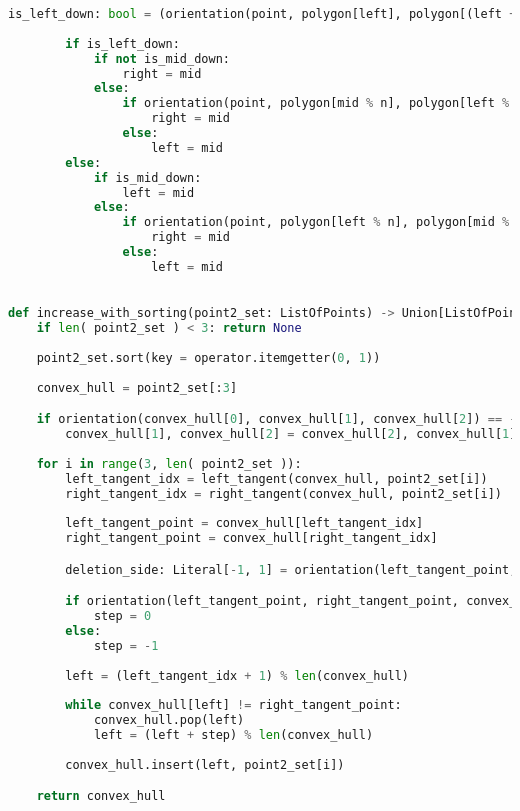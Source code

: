 \documentclass[11pt]{article}
\theoremstyle{remark} \newtheorem{definition}{def.}
\theoremstyle{definition} \newtheorem{twierdzenie}{tw.}
\begin{document}
\begin{lstlisting}[language=Python]
        is_left_down: bool = (orientation(point, polygon[left], polygon[(left + 1) % n]) == 1)
        
        if is_left_down:
            if not is_mid_down:
                right = mid
            else:
                if orientation(point, polygon[mid % n], polygon[left % n]) == 1:
                    right = mid
                else:
                    left = mid
        else:
            if is_mid_down:
                left = mid
            else:
                if orientation(point, polygon[left % n], polygon[mid % n]) == 1:
                    right = mid
                else:
                    left = mid

        
def increase_with_sorting(point2_set: ListOfPoints) -> Union[ListOfPoints, None]:
    if len( point2_set ) < 3: return None
    
    point2_set.sort(key = operator.itemgetter(0, 1))
    
    convex_hull = point2_set[:3]

    if orientation(convex_hull[0], convex_hull[1], convex_hull[2]) == -1:
        convex_hull[1], convex_hull[2] = convex_hull[2], convex_hull[1]
    
    for i in range(3, len( point2_set )):
        left_tangent_idx = left_tangent(convex_hull, point2_set[i])
        right_tangent_idx = right_tangent(convex_hull, point2_set[i])
        
        left_tangent_point = convex_hull[left_tangent_idx]
        right_tangent_point = convex_hull[right_tangent_idx]        

        deletion_side: Literal[-1, 1] = orientation(left_tangent_point, right_tangent_point, point2_set[i])

        if orientation(left_tangent_point, right_tangent_point, convex_hull[(left_tangent_idx + 1) % len(convex_hull)]) == deletion_side:
            step = 0
        else: 
            step = -1
            
        left = (left_tangent_idx + 1) % len(convex_hull)
        
        while convex_hull[left] != right_tangent_point:
            convex_hull.pop(left)
            left = (left + step) % len(convex_hull)
            
        convex_hull.insert(left, point2_set[i])

    return convex_hull
\end{lstlisting}

\medskip
\end{document}
